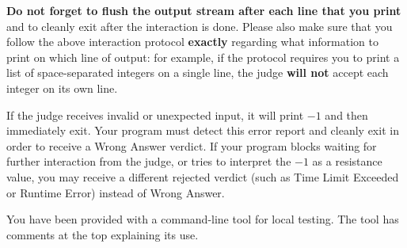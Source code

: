 

\textbf{Do not forget to flush the output stream after each line that you print} and to cleanly exit after the interaction is done. Please also make sure that you follow the above interaction protocol \textbf{exactly} regarding what information to print on which line of output: for example, if the protocol requires you to print a list of space-separated integers on a single line, the judge \textbf{will not} accept each integer on its own line.

If the judge receives invalid or unexpected input, it will print $-1$ and then immediately exit. Your program must detect this error report and cleanly exit in order to receive a Wrong Answer verdict. If your program blocks waiting for further interaction from the judge, or tries to interpret the $-1$ as a resistance value, you may receive a different rejected verdict (such as Time Limit Exceeded or Runtime Error) instead of Wrong Answer.

You have been provided with a command-line tool for local testing. The tool has comments at the top explaining its use.
